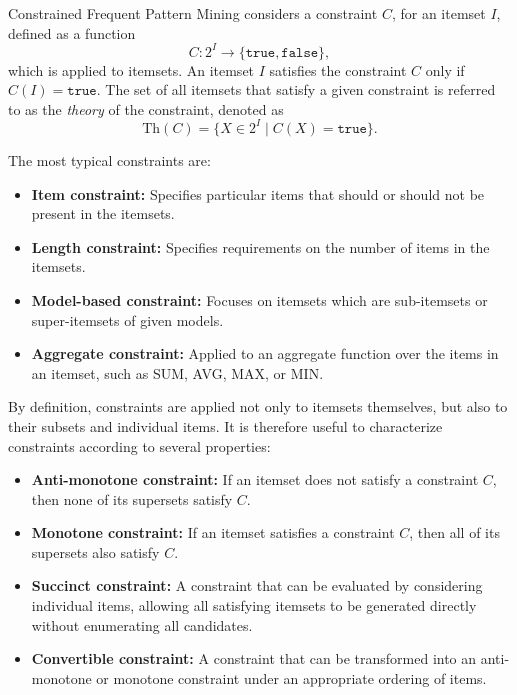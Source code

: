 Constrained Frequent Pattern Mining considers a constraint $C$, for an itemset $I$, defined as a function
\[
C : 2^I \to \{\texttt{true}, \texttt{false}\},
\]
which is applied to itemsets. An itemset $I$ satisfies the constraint $C$ only if $C(I) = \texttt{true}$. 
The set of all itemsets that satisfy a given constraint is referred to as the \emph{theory} of the constraint, denoted as
\[
\text{Th}(C) = \{ X \in 2^I \mid C(X) = \texttt{true} \}.
\] 
\parencite{Bonchi2004}

The most typical constraints are:

\begin{itemize}
    \item \textbf{Item constraint:} Specifies particular items that should or should not be present in the itemsets.
    
    \item \textbf{Length constraint:} Specifies requirements on the number of items in the itemsets.
    
    \item \textbf{Model-based constraint:} Focuses on itemsets which are sub-itemsets or super-itemsets of given models.
    
    \item \textbf{Aggregate constraint:} Applied to an aggregate function over the items in an itemset, such as SUM, AVG, MAX, or MIN.
\end{itemize}

\parencite{Pei2002}

By definition, constraints are applied not only to itemsets themselves, but also to their subsets and individual items. It is therefore useful to characterize constraints according to several properties:

\begin{itemize}
    \item \textbf{Anti-monotone constraint:} If an itemset does not satisfy a constraint $C$, then none of its supersets satisfy $C$.
    
    \item \textbf{Monotone constraint:} If an itemset satisfies a constraint $C$, then all of its supersets also satisfy $C$.
    
    \item \textbf{Succinct constraint:} A constraint that can be evaluated by considering individual items, allowing all satisfying itemsets to be generated directly without enumerating all candidates.
    
    \item \textbf{Convertible constraint:} A constraint that can be transformed into an anti-monotone or monotone constraint under an appropriate ordering of items.
\end{itemize}


